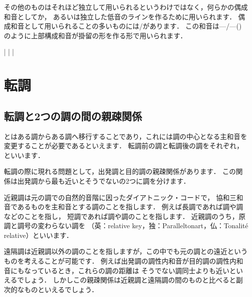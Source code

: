 \documentclass[dvipdfmx,uplatex,b5paper,openany,jbase=12Q,nomag*,textwidth-limit=44%
               ]{gachimuchi}
\begin{document}
その他のものはそれほど独立して用いられるというわけではなく，何らかの偶成和音としてか，
あるいは独立した低音のラインを作るために用いられます．
偶成和音として用いられることの多いものには\Gnv{}/\Gni があります．
この和音は\Gnv{}---\Gnv{}/\Gni---\Gni(\Min)のように上部構成和音が掛留の形を作る形で用いられます．
\begin{Music}[0.5\linewidth]
  \generalmeter{\allabreve}%
  \Startpiece
  \NOTes%
  |\hp%
  \en\bar
  \NOTes%
  |%
  \en\setdoublebar
  \endpiece
\end{Music}

\chapter{転調}
\section{転調と2つの調の間の親疎関係}
とはある調からある調へ移行することであり，これには調の中心となる主和音を変更することが必要であるといえます．
転調前の調と転調後の調をそれぞれ，といいます．

転調の際に現れる問題として，出発調と目的調の親疎関係があります．
この関係は出発調から最も近いとそうでないの2つに調を分けます．

近親調は元の調での自然的音階に因ったダイアトニック・コードで，
協和三和音であるものを主和音とする調のことを指します．
例えば長調であれば\Gnii\Min 調や\Gniv 調などのことを指し，
短調であれば\bFlat\Gniii 調や\Gnv\Min 調のことを指します．
近親調のうち，原調と調号の変わらない調を
（英：relative key，独：Paralleltonart，仏：Tonalité relative）といいます．

遠隔調は近親調以外の調のことを指しますが，この中でも元の調との遠近というものを考えることが可能です．
例えば出発調の調性内和音が目的調の調性内和音にもなっているとき，これらの調の距離は
そうでない調同士よりも近いといえるでしょう．
しかしこの親疎関係は近親調と遠隔調の間のものと比べると副次的なものといえるでしょう．
\end{document}
